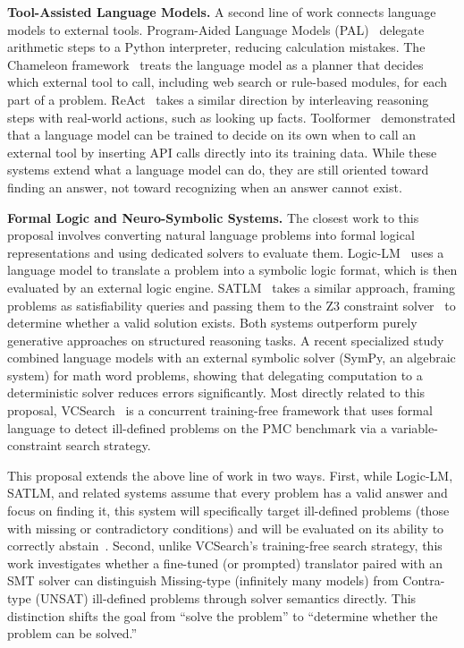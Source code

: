 \documentclass[sigconf, nonacm, onecolumn]{acmart}
\begin{document}
\textbf{Tool-Assisted Language Models.} A second line of work connects language models to
external tools. Program-Aided Language Models (PAL)~\cite{gao2023} delegate arithmetic
steps to a Python interpreter, reducing calculation mistakes. The Chameleon
framework~\cite{lu2023} treats the language model as a planner that decides which external
tool to call, including web search or rule-based modules, for each part of a problem.
ReAct~\cite{yao2023} takes a similar direction by interleaving reasoning steps with
real-world actions, such as looking up facts. Toolformer~\cite{schick2023} demonstrated
that a language model can be trained to decide on its own when to call an external tool
by inserting API calls directly into its training data. While these systems extend what a
language model can do, they are still oriented toward finding an answer, not toward
recognizing when an answer cannot exist.

\textbf{Formal Logic and Neuro-Symbolic Systems.} The closest work to this proposal
involves converting natural language problems into formal logical representations and using
dedicated solvers to evaluate them. Logic-LM~\cite{pan2023} uses a language model to
translate a problem into a symbolic logic format, which is then evaluated by an external
logic engine. SATLM~\cite{ye2023} takes a similar approach, framing problems as
satisfiability queries and passing them to the Z3 constraint solver~\cite{demoura2008} to
determine whether a valid solution exists. Both systems outperform purely generative
approaches on structured reasoning tasks. A recent specialized study~\cite{heyueya2023}
combined language models with an external symbolic solver (SymPy, an algebraic system) for
math word problems, showing that delegating computation to a deterministic solver reduces
errors significantly. Most directly related to this proposal, VCSearch~\cite{zhou2024} is a
concurrent training-free framework that uses formal language to detect ill-defined
problems on the PMC benchmark via a variable-constraint search strategy.

This proposal extends the above line of work in two ways. First, while Logic-LM, SATLM,
and related systems assume that every problem has a valid answer and focus on finding it,
this system will specifically target ill-defined problems (those with missing or
contradictory conditions) and will be evaluated on its ability to correctly
abstain~\cite{puchalska1987,zhou2024}. Second, unlike VCSearch's training-free search
strategy, this work investigates whether a fine-tuned (or prompted) translator paired with
an SMT solver can distinguish Missing-type (infinitely many models) from Contra-type
(UNSAT) ill-defined problems through solver semantics directly. This distinction shifts the
goal from ``solve the problem'' to ``determine whether the problem can be solved.''
\end{document}
